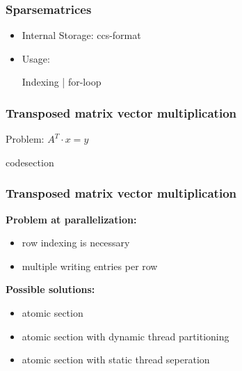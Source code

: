 \documentclass{beamer}
\begin{document}

\begin{frame}
\frametitle{Sparsematrices}
\begin{itemize}
\item Internal Storage: ccs-format
\item Usage:
\begin{block}{Indexing | for-loop}
\codeA
\end{block}
\end{itemize}
\end{frame}



\begin{frame}
\frametitle{Transposed matrix vector multiplication}
Problem: $A^T\cdot x=y$
\begin{block}{codesection}
\codeB
\end{block}
\end{frame}


\begin{frame}
\frametitle{Transposed matrix vector multiplication}
\textbf{Problem at parallelization:}
\begin{itemize}
\item row indexing is necessary
\item multiple writing entries per row
\end{itemize}

\textbf{Possible solutions:}
\begin{itemize}
\item atomic section
\item atomic section with dynamic thread partitioning \codeC
\item atomic section with static thread seperation
\end{itemize}
\end{frame}
\end{document}
